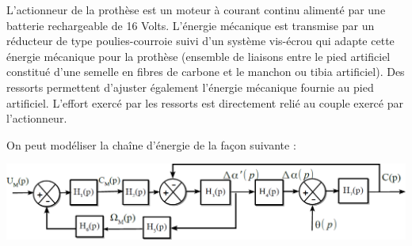 \documentclass[10pt,fleqn]{article} %
\begin{document}
\begin{multicols}{2}
\begin{center}
\end{center}



L'actionneur de la prothèse est un moteur à courant
continu alimenté par une batterie rechargeable de 16
Volts. L'énergie mécanique est transmise par un
réducteur de type poulies-courroie suivi d'un
système vis-écrou qui adapte cette énergie
mécanique pour la prothèse (ensemble de liaisons
entre le pied artificiel constitué d'une semelle en
fibres de carbone et le manchon ou tibia artificiel).
Des ressorts permettent d'ajuster également l'énergie
mécanique fournie au pied artificiel. L'effort exercé
par les ressorts est directement relié au couple
exercé par l'actionneur.



On peut modéliser la chaîne d'énergie de la façon suivante : 
\begin{center}
\includegraphics[width=\linewidth]{images/ccmp_07}
\end{center}


\end{multicols}
\end{document}
